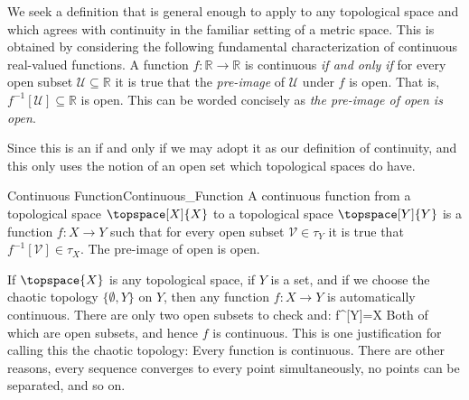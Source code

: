 \documentclass{book}                                                           %
\begin{document}
                \hfill
                \begin{minipage}[t]{0.50\textwidth}
                    We seek a definition that is general enough to apply to any
                    topological space and which agrees with continuity in the
                    familiar setting of a metric space. This is obtained by
                    considering the following fundamental characterization of
                    continuous real-valued functions. A function
                    $f:\mathbb{R}\rightarrow\mathbb{R}$ is continuous
                    \textit{if and only if} for every open subset
                    $\mathcal{U}\subseteq\mathbb{R}$ it is true that the
                    \textit{pre-image} of $\mathcal{U}$ under $f$ is open. That
                    is, $f^{\minus{1}}[\mathcal{U}]\subseteq\mathbb{R}$ is open.
                    This can be worded concisely as
                    \textit{the pre-image of open is open}.
                \end{minipage}
                \par\hfill\par
                Since this is an if and only if we may adopt it as our
                definition of continuity, and this only uses the notion of an
                open set which topological spaces do have.
                \begin{fdefinition}{Continuous Function}{Continuous_Function}
                    A continuous function from a topological space
                    $\topspace[X]{X}$ to a topological space $\topspace[Y]{Y}$
                    is a function $f:X\rightarrow{Y}$ such that for every open
                    subset $\mathcal{V}\in\tau_{Y}$ it is true that
                    $f^{\minus{1}}[\mathcal{V}]\in\tau_{X}$. The pre-image of
                    open is open.
                \end{fdefinition}
                \begin{example}
                    If $\topspace{X}$ is any topological space, if
                    $Y$ is a set, and if we choose the chaotic topology
                    $\{\emptyset,Y\}$ on $Y$, then any function
                    $f:X\rightarrow{Y}$ is automatically continuous. There are
                    only two open subsets to check and:
                                {f^{}[Y]=X}
                    Both of which are open subsets, and hence $f$ is continuous.
                    This is one justification for calling this the chaotic
                    topology: Every function is continuous. There are other
                    reasons, every sequence converges to every point
                    simultaneously, no points can be separated, and so on.
                \end{example}
\end{document}
